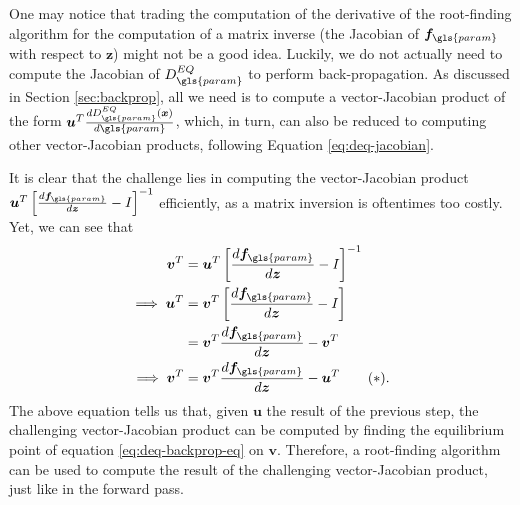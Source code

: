 One may notice that trading the computation of the derivative of the root-finding algorithm for the computation of a matrix inverse (the Jacobian of $\bm{f}_{\gls{param}}$ with respect to $\bm{z}$) might not be a good idea.
Luckily, we do not actually need to compute the Jacobian of $D^{EQ}_{\gls{param}}$ to perform back-propagation.
As discussed in Section \ref{sec:backprop}, all we need is to compute a vector-Jacobian product of the form $\bm{u}^T\frac{d D^{EQ}_{\gls{param}}(\bm{x})}{d \gls{param}}$, which, in turn, can also be reduced to computing other vector-Jacobian products, following Equation \eqref{eq:deq-jacobian}.

It is clear that the challenge lies in computing the vector-Jacobian product $\bm{u}^T\left[ \frac{d \bm{f}_{\gls{param}}}{d \bm{z}} - I \right]^{-1}$ efficiently, as a matrix inversion is oftentimes too costly.
Yet, we can see that
\begin{align*}
    \bm{v}^T &= \bm{u}^T\left[ \frac{d \bm{f}_{\gls{param}}}{d \bm{z}} - I \right]^{-1} \\
    \implies \bm{u}^T &= \bm{v}^T\left[ \frac{d \bm{f}_{\gls{param}}}{d \bm{z}} - I \right] \\
		      &= \bm{v}^T \frac{d \bm{f}_{\gls{param}}}{d \bm{z}} - \bm{v}^T \\
    \implies \bm{v}^T &= \bm{v}^T \frac{d \bm{f}_{\gls{param}}}{d \bm{z}} - \bm{u}^T \tag{$*$}\label{eq:deq-backprop-eq}
.\end{align*}
The above equation tells us that, given $\bm{u}$ the result of the previous step, the challenging vector-Jacobian product can be computed by finding the equilibrium point of equation \eqref{eq:deq-backprop-eq} on $\bm{v}$.
Therefore, a root-finding algorithm can be used to compute the result of the challenging vector-Jacobian product, just like in the forward pass.

